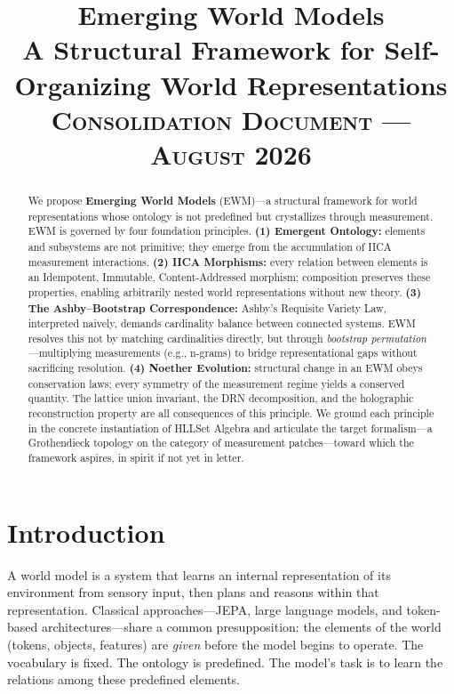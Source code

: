 \documentclass[11pt,a4paper]{article}
\title{\textbf{Emerging World Models}\\[4pt]
\large A Structural Framework for Self-Organizing World Representations
\\[4pt]
\large \textsc{Consolidation Document --- August 2026}}
\date{}
\theoremstyle{remark}
\begin{document}
\maketitle

\begin{abstract}
We propose \textbf{Emerging World Models} (EWM)---a structural framework for world
representations whose ontology is not predefined but crystallizes through measurement.
EWM is governed by four foundation principles. \textbf{(1) Emergent Ontology:} elements
and subsystems are not primitive; they emerge from the accumulation of IICA measurement
interactions. \textbf{(2) IICA Morphisms:} every relation between elements is an
Idempotent, Immutable, Content-Addressed morphism; composition preserves these
properties, enabling arbitrarily nested world representations without new theory.
\textbf{(3) The Ashby--Bootstrap Correspondence:} Ashby's Requisite Variety Law,
interpreted naively, demands cardinality balance between connected systems. EWM resolves
this not by matching cardinalities directly, but through \textit{bootstrap
permutation}---multiplying measurements (e.g., n-grams) to bridge representational gaps
without sacrificing resolution. \textbf{(4) Noether Evolution:} structural change in an
EWM obeys conservation laws; every symmetry of the measurement regime yields a conserved
quantity. The lattice union invariant, the DRN decomposition, and the holographic
reconstruction property are all consequences of this principle. We ground each principle
in the concrete instantiation of HLLSet Algebra and articulate the target formalism---a
Grothendieck topology on the category of measurement patches---toward which the framework
aspires, in spirit if not yet in letter.
\end{abstract}

\section{Introduction}

A world model is a system that learns an internal representation of its environment
from sensory input, then plans and reasons within that representation. Classical
approaches---JEPA, large language models, and token-based architectures---share a common
presupposition: the elements of the world (tokens, objects, features) are \textit{given}
before the model begins to operate. The vocabulary is fixed. The ontology is predefined.
The model's task is to learn the relations among these predefined elements.
\end{document}
